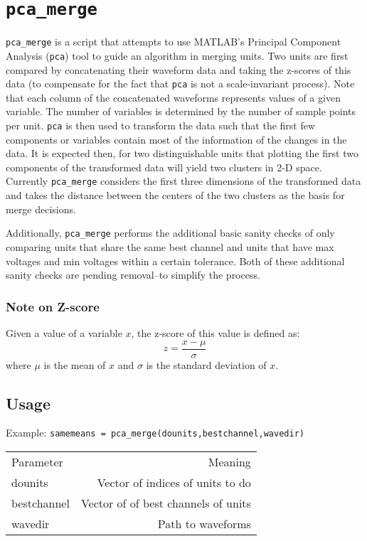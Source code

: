 \documentclass{article}
\begin{document}
\section{\texttt{pca\_merge}}
\texttt{pca\_merge} is a script that attempts to use MATLAB's Principal
Component Analysis (\texttt{pca}) tool to guide an algorithm in merging units. 
Two units are first compared by concatenating their waveform data and
taking the z-scores of this data (to compensate for the fact that
\texttt{pca} is not a scale-invariant process). Note that each column of
the concatenated waveforms represents values of a given variable. The
number of variables is determined by the number of sample points per
unit. \texttt{pca} is then used to transform the data such that 
the first few components or variables contain most of the information of
the changes in the data. It is expected then, for two distinguishable
units that plotting the first two components of the transformed data
will yield two clusters in 2-D space. Currently \texttt{pca\_merge}
considers the first three dimensions of the transformed data and takes
the distance between the centers of the two clusters as the basis for
merge decisions. 

Additionally, \texttt{pca\_merge} performs the additional basic sanity
checks of only comparing units that share the same best channel and
units that have max voltages and min voltages within a certain
tolerance. Both of these additional sanity checks are pending
removal--to simplify the process.


\subsubsection{Note on Z-score}
Given a value of a variable \ensuremath{x}, the z-score of this value is
defined as:
\begin{equation}
z =\frac{ x - \mu}{\sigma}
\end{equation}
where \ensuremath{\mu} is the mean of \ensuremath{x} and
\ensuremath{\sigma} is the standard deviation of \ensuremath{x}.

\subsection{Usage}

Example:
\texttt{samemeans = pca\_merge(dounits,bestchannel,wavedir)}
\begin{center}
\begin{tabular}{l r}
Parameter&Meaning\\
dounits&Vector of indices of units to do\\
bestchannel&Vector of of best channels of units\\
wavedir &Path to waveforms
\end{tabular}
\end{center}
\end{document}
